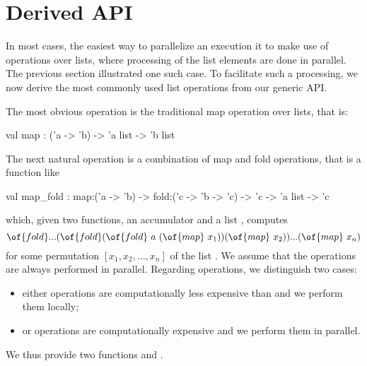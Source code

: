 \documentclass[a4paper,12pt]{article}
\newcommand{\Ocaml}{OCaml}
\begin{document}
\begin{comment}
When master and worker programs are compiled with different
versions of the \Ocaml\ compiler, our library still provides
a monomorphic API over strings. As a consequence, we need to convert
integers to and from strings in both master and worker.
The modified worker program is as follows:
\begin{ocaml}
  open Mono
  let worker i = ...
  let worker_string i = string_of_int (worker (int_of_string i))
  let () = Worker.compute worker_string ()
\end{ocaml}
The master program is modified in a similar way.
We simply replace \of{Poly} with \of{Mono} and encode/decode integers
as strings, as follows:
\begin{ocaml}
  let tasks = 
    let l = ref [] in 
    for i = 0 to n do l := (string_of_int i, ()) :: !l done; 
    !l
  let master (i,()) fi = s := !s + int_of_string fi; []
\end{ocaml}
\end{comment}

\section{Derived API}\label{sec:derived}

In most cases, the easiest way to parallelize an execution it to make
use of operations over lists, where processing of the
list elements are done in parallel. 
The previous section illustrated one such case.
To facilitate such a processing,
we now derive the most commonly used list operations from our generic
API.

The most obvious operation is the traditional map operation over
lists, that is:
\begin{ocaml}
  val map : ('a -> 'b) -> 'a list -> 'b list
\end{ocaml}
The next natural operation is a combination of map and fold
operations, that is a function like
\begin{ocaml}
 val map_fold :
   map:('a -> 'b) -> fold:('c -> 'b -> 'c) -> 
   'c -> 'a list -> 'c
\end{ocaml}
which, given two functions, an accumulator  and a list , computes
\begin{equation}\label{eq:map-fold}
  \of{fold} ... (\of{fold} (\of{fold} ~ a ~ (\of{map} ~ x_1)) (\of{map} ~ x_2))
  ... (\of{map} ~ x_n)
\end{equation}
for some permutation $[x_1,x_2,...,x_n]$ of the list .
We assume that the  operations are always performed in parallel.
Regarding  operations, we distinguish two cases:
\begin{itemize}
\item either  operations are computationally less expensive
  than  and we perform them locally;
\item or  operations are computationally expensive and we
  perform them in parallel.
\end{itemize}
We thus provide two functions  and 
.
\end{document}
